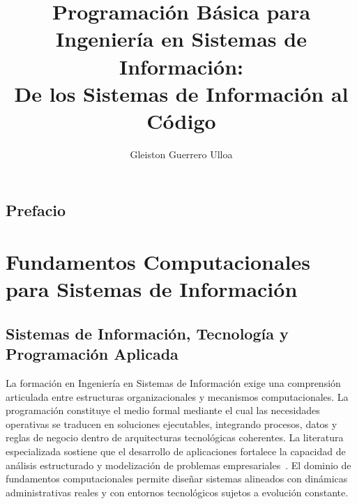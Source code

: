 \documentclass[12pt,twoside]{book}
\begin{document}
	
	\frontmatter
	
	\title{Programación Básica para Ingeniería en Sistemas de Información:\\
		De los Sistemas de Información al Código}
	\author{Gleiston Guerrero Ulloa}
	\date{}
	\maketitle
	
	\tableofcontents
	
	\chapter*{Prefacio}
	
	\mainmatter
	
	\part{Fundamentos Computacionales para Sistemas de Información}
		\chapter{Sistemas de Información, Tecnología y Programación Aplicada}
			\noindent
			La formación en Ingeniería en Sistemas de Información exige una comprensión articulada entre estructuras organizacionales y mecanismos computacionales. La programación constituye el medio formal mediante el cual las necesidades operativas se traducen en soluciones ejecutables, integrando procesos, datos y reglas de negocio dentro de arquitecturas tecnológicas coherentes. La literatura especializada sostiene que el desarrollo de aplicaciones fortalece la capacidad de análisis estructurado y modelización de problemas empresariales~\cite{Kendall2014Systems,Laudon2020Management}. El dominio de fundamentos computacionales permite diseñar sistemas alineados con dinámicas administrativas reales y con entornos tecnológicos sujetos a evolución constante.
			
\end{document}
